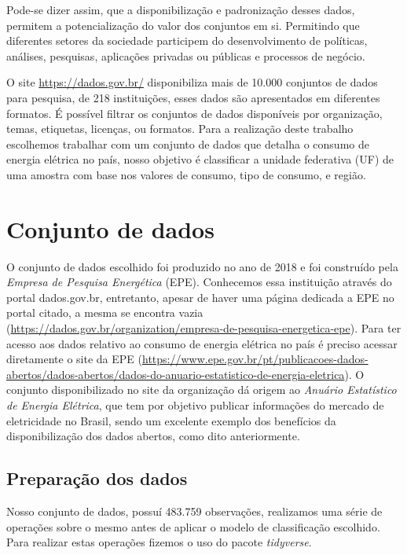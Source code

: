 \documentclass[12pt]{article}
\begin{document}
    Pode-se dizer assim, que a disponibilização e padronização desses dados, permitem a potencialização do valor dos conjuntos em si. Permitindo que diferentes setores da sociedade participem do desenvolvimento de políticas, análises, pesquisas, aplicações privadas ou públicas e processos de negócio.

    O site \href{dados.gov.br/}{https://dados.gov.br/} disponibiliza mais de 10.000 conjuntos de dados para pesquisa, de 218 instituições, esses dados são apresentados em diferentes formatos. É possível filtrar os conjuntos de dados disponíveis por organização, temas, etiquetas, licenças, ou formatos. Para a realização deste trabalho escolhemos trabalhar com um conjunto de dados que detalha o consumo de energia elétrica no país, nosso objetivo é classificar a unidade federativa (UF) de uma amostra com base nos valores de consumo, tipo de consumo, e região.
    
\section{Conjunto de dados} 

O conjunto de dados escolhido foi produzido no ano de 2018 e foi construído pela \textit{Empresa de Pesquisa Energética} (EPE). Conhecemos essa instituição através do  portal dados.gov.br, entretanto, apesar de haver uma página dedicada a EPE no portal citado, a mesma se encontra vazia (\href{https://dados.gov.br/organization/empresa-de-pesquisa-energetica-epe}{https://dados.gov.br/organization/empresa-de-pesquisa-energetica-epe}). Para ter acesso aos dados relativo ao consumo de energia elétrica no país é preciso acessar diretamente o site da EPE (\href{https://www.epe.gov.br/pt/publicacoes-dados-abertos/dados-abertos/dados-do-anuario-estatistico-de-energia-eletrica}{https://www.epe.gov.br/pt/publicacoes-dados-abertos/dados-abertos/dados-do-anuario-estatistico-de-energia-eletrica}). 
O conjunto disponibilizado no site da organização dá origem ao \textit{Anuário Estatístico de Energia Elétrica}, que tem por objetivo publicar informações do mercado de eletricidade no Brasil, sendo um excelente exemplo dos benefícios da disponibilização dos dados abertos, como dito anteriormente.

\subsection{Preparação dos dados}
Nosso conjunto de dados, possuí 483.759 observações, realizamos uma série de operações sobre o mesmo antes de aplicar o modelo de classificação escolhido. Para realizar estas operações fizemos o uso do pacote \textit{tidyverse}.
\end{document}
